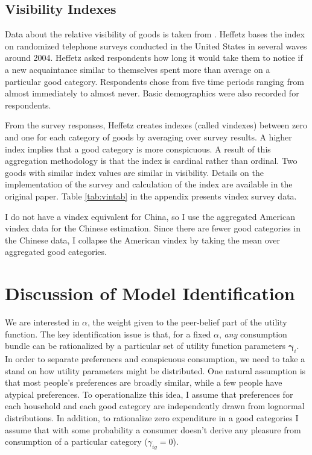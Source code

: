 \subsection{Visibility Indexes}
Data about the relative visibility of goods is taken from \citet{Heffetz2011}.  
Heffetz bases the index on randomized telephone surveys conducted in the United States in several waves around 2004.
Heffetz asked respondents how long it would take them to notice if a new acquaintance similar to themselves spent more than average on a particular good category.
Respondents chose from five time periods ranging from almost immediately to almost never.
Basic demographics were also recorded for respondents.

From the survey responses, Heffetz creates indexes (called vindexes) between zero and one for each category of goods by averaging over survey results.  
A higher index implies that a good category is  more conspicuous. 
A result of this aggregation methodology is that the index is cardinal rather than ordinal.  Two goods with similar index values are similar in visibility.  Details on the implementation of the survey and calculation of the index are available in the original paper.
Table \ref{tab:vintab} in the appendix presents vindex survey data.

I do not have a vindex equivalent for China, so I use the aggregated American vindex data for the Chinese estimation. Since there are fewer good categories in the Chinese data, I collapse the American vindex by taking the mean over aggregated good categories.

\section{Discussion of Model Identification}

We are interested in $\alpha$, the weight given to the peer-belief part of the utility function.  The key identification issue is that, for a fixed $\alpha$, \emph{any} consumption bundle can be rationalized by a particular set of utility function parameters $\boldsymbol{\gamma}_i$.  In order to separate preferences and conspicuous consumption, we need to take a stand on how utility parameters might be distributed.  One natural assumption is that most people's preferences are broadly similar, while a few people have atypical preferences.  To operationalize this idea, I assume that preferences for each household and each good category are independently drawn from lognormal distributions.  In addition, to rationalize zero expenditure in a good categories I assume that with some probability a consumer doesn't derive any pleasure from consumption of a particular category ($\gamma_{ig} = 0$).

